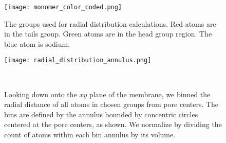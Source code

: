   \begin{figure}
  \begin{minipage}{0.45\linewidth}
  \centering
  \texttt{[image: monomer\_color\_coded.png]}
  \vspace{4.5em}
  \caption{The groups used for radial distribution calculations. Red atoms are in the
  tails group. Green atoms are in the head group region. The blue atom is sodium.}\label{S-fig:monomer_color_coded}
  \end{minipage}\qquad
  \begin{minipage}{0.45\textwidth}
  \centering
  \texttt{[image: radial\_distribution\_annulus.png]}
  \caption{
  Looking down onto the $xy$ plane of the membrane, 
  we binned the radial distance of all atoms in chosen groups from
  pore centers. The bins are defined by the annulus bounded by concentric
  circles centered at the pore centers, as shown. We normalize by
  dividing the count of atoms within each bin annulus by its volume.
  }~\label{S-fig:rdf_diagram}
  \end{minipage}
  \end{figure}
